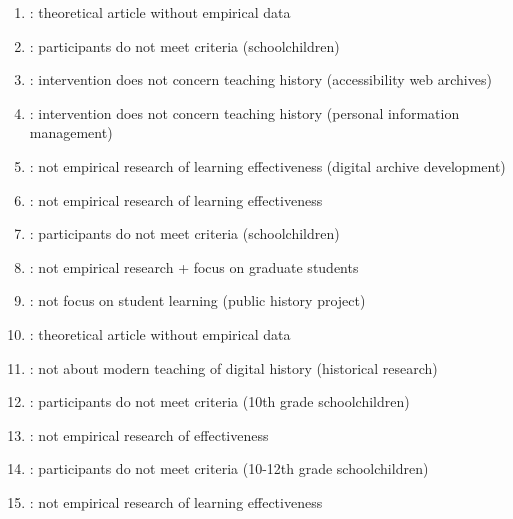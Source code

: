 \documentclass[
hf,
]{ceurart}
\begin{document}
\begin{enumerate}
    \item \citet{Crymble202185}: theoretical article without empirical data
    
    \item \citet{Ethier202311}: participants do not meet criteria (schoolchildren)
    
    \item \citet{Sunkara2024203}: intervention does not concern teaching history (accessibility web archives)
    
    \item \citet{Syn2020909}: intervention does not concern teaching history (personal information management)
    
    \item \citet{Conte202183}: not empirical research of learning effectiveness (digital archive development)
    
    \item \citet{Sebring2012229}: not empirical research of learning effectiveness
    
    \item \citet{Hopf2024375}: participants do not meet criteria (schoolchildren)
    
    \item \citet{Armand2013753}: not empirical research + focus on graduate students
    
    \item \citet{Zapata2018407}: not focus on student learning (public history project)
    
    \item \citet{Torgerson202237}: theoretical article without empirical data
    
    \item \citet{Millan202251}: not about modern teaching of digital history (historical research)
    
    \item \citet{Zielezinski20141137}: participants do not meet criteria (10th grade schoolchildren)
    
    \item \citet{Ahlfeld2021493}: not empirical research of effectiveness
    
    \item \citet{Ruth2021}: participants do not meet criteria (10-12th grade schoolchildren)
    
    \item \citet{Middleton2014192}: not empirical research of learning effectiveness
\end{enumerate}
\end{document}
